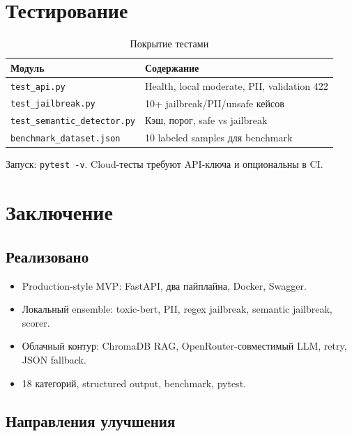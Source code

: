\documentclass[12pt,a4paper]{report}
\begin{document}
\chapter{Тестирование}

\begin{table}[H]
\centering
\caption{Покрытие тестами}
\begin{tabular}{@{}lp{8.5cm}@{}}
\toprule
\textbf{Модуль} & \textbf{Содержание} \\
\midrule
\texttt{test\_api.py} & Health, local moderate, PII, validation 422 \\
\texttt{test\_jailbreak.py} & 10+ jailbreak/PII/unsafe кейсов \\
\texttt{test\_semantic\_detector.py} & Кэш, порог, safe vs jailbreak \\
\texttt{benchmark\_dataset.json} & 10 labeled samples для benchmark \\
\bottomrule
\end{tabular}
\end{table}

Запуск: \texttt{pytest -v}. Cloud-тесты требуют API-ключа и опциональны в CI.

\chapter{Заключение}

\section{Реализовано}

\begin{itemize}
    \item Production-style MVP: FastAPI, два пайплайна, Docker, Swagger.
    \item Локальный ensemble: toxic-bert, PII, regex jailbreak, semantic jailbreak, scorer.
    \item Облачный контур: ChromaDB RAG, OpenRouter-совместимый LLM, retry, JSON fallback.
    \item 18 категорий, structured output, benchmark, pytest.
\end{itemize}

\section{Направления улучшения}
\end{document}
